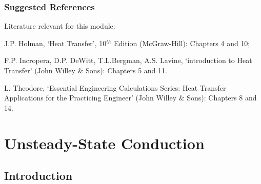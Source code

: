 \documentclass[10pt,compress]{beamer}
\begin{document}
\begin{frame}
 \frametitle{Suggested References}
  Literature relevant for this module:
  \begin{enumerate}[{[}1{]}]
    \item J.P. Holman, `Heat Transfer', 10$^{th}$ Edition (McGraw-Hill): Chapters 4 and 10;
    \item F.P. Incropera, D.P. DeWitt, T.L.Bergman, A.S. Lavine, `introduction to Heat Transfer' (John Willey $\&$ Sons): Chapters 5 and 11.
    \item L. Theodore, `Essential Engineering Calculations Series: Heat Transfer Applications for the Practicing Engineer' (John Willey $\&$ Sons): Chapters 8 and 14.
  \end{enumerate}
\end{frame}
 

\section{Unsteady-State Conduction}

\subsection{Introduction}
\end{document}

